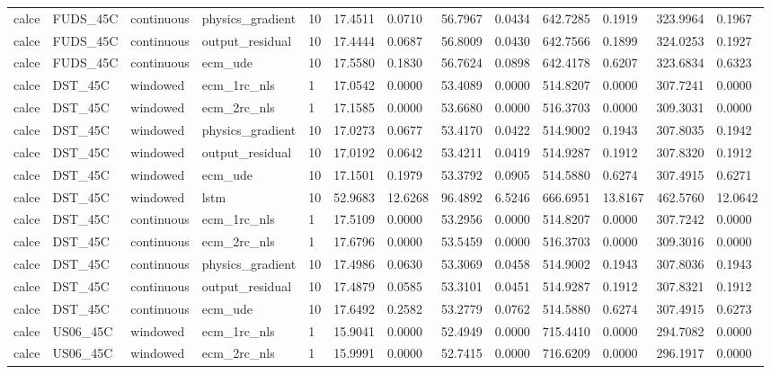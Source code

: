 \begin{tabular}{lllllllllllll}
calce & FUDS\_45C & continuous & physics\_gradient & 10 & 17.4511 & 0.0710 & 56.7967 & 0.0434 & 642.7285 & 0.1919 & 323.9964 & 0.1967 \\
calce & FUDS\_45C & continuous & output\_residual & 10 & 17.4444 & 0.0687 & 56.8009 & 0.0430 & 642.7566 & 0.1899 & 324.0253 & 0.1927 \\
calce & FUDS\_45C & continuous & ecm\_ude & 10 & 17.5580 & 0.1830 & 56.7624 & 0.0898 & 642.4178 & 0.6207 & 323.6834 & 0.6323 \\
calce & DST\_45C & windowed & ecm\_1rc\_nls & 1 & 17.0542 & 0.0000 & 53.4089 & 0.0000 & 514.8207 & 0.0000 & 307.7241 & 0.0000 \\
calce & DST\_45C & windowed & ecm\_2rc\_nls & 1 & 17.1585 & 0.0000 & 53.6680 & 0.0000 & 516.3703 & 0.0000 & 309.3031 & 0.0000 \\
calce & DST\_45C & windowed & physics\_gradient & 10 & 17.0273 & 0.0677 & 53.4170 & 0.0422 & 514.9002 & 0.1943 & 307.8035 & 0.1942 \\
calce & DST\_45C & windowed & output\_residual & 10 & 17.0192 & 0.0642 & 53.4211 & 0.0419 & 514.9287 & 0.1912 & 307.8320 & 0.1912 \\
calce & DST\_45C & windowed & ecm\_ude & 10 & 17.1501 & 0.1979 & 53.3792 & 0.0905 & 514.5880 & 0.6274 & 307.4915 & 0.6271 \\
calce & DST\_45C & windowed & lstm & 10 & 52.9683 & 12.6268 & 96.4892 & 6.5246 & 666.6951 & 13.8167 & 462.5760 & 12.0642 \\
calce & DST\_45C & continuous & ecm\_1rc\_nls & 1 & 17.5109 & 0.0000 & 53.2956 & 0.0000 & 514.8207 & 0.0000 & 307.7242 & 0.0000 \\
calce & DST\_45C & continuous & ecm\_2rc\_nls & 1 & 17.6796 & 0.0000 & 53.5459 & 0.0000 & 516.3703 & 0.0000 & 309.3016 & 0.0000 \\
calce & DST\_45C & continuous & physics\_gradient & 10 & 17.4986 & 0.0630 & 53.3069 & 0.0458 & 514.9002 & 0.1943 & 307.8036 & 0.1943 \\
calce & DST\_45C & continuous & output\_residual & 10 & 17.4879 & 0.0585 & 53.3101 & 0.0451 & 514.9287 & 0.1912 & 307.8321 & 0.1912 \\
calce & DST\_45C & continuous & ecm\_ude & 10 & 17.6492 & 0.2582 & 53.2779 & 0.0762 & 514.5880 & 0.6274 & 307.4915 & 0.6273 \\
calce & US06\_45C & windowed & ecm\_1rc\_nls & 1 & 15.9041 & 0.0000 & 52.4949 & 0.0000 & 715.4410 & 0.0000 & 294.7082 & 0.0000 \\
calce & US06\_45C & windowed & ecm\_2rc\_nls & 1 & 15.9991 & 0.0000 & 52.7415 & 0.0000 & 716.6209 & 0.0000 & 296.1917 & 0.0000 \\

\end{tabular}
